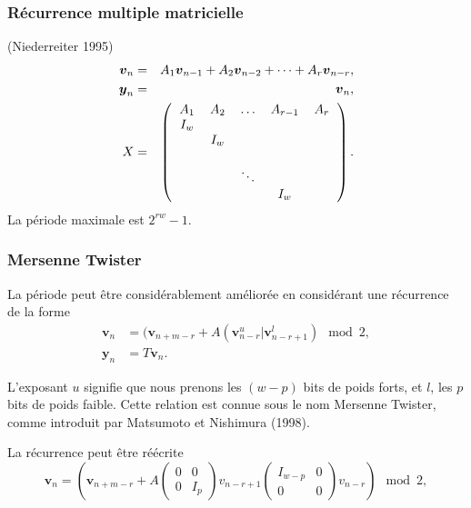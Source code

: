 \documentclass[t,usepdftitle=false]{beamer}
\def\bv{\boldsymbol{v}}
\def\by{\boldsymbol{y}}
\begin{document}
\begin{frame}
\frametitle{Récurrence multiple matricielle}

(Niederreiter 1995)
\begin {eqnarray*}
 \bv_n &=& A_1 \bv_{n-1} + A_2 \bv_{n-2} + \cdots + A_r \bv_{n-r},\\
 {\by_n} &=& \bv_{n}, \\
   X &=&
\left(
\begin{tabular}{ccccc}
$A_1$& $A_2$ & $\ldots$ & $A_{r-1}$ & $A_r$ \\
$I_w$&      &        &     &    \\
   &  $I_w$ &        &     &    \\
   &        &        &     &    \\
   &        &$\ddots$&     &    \\
   &        &        &$I_w$&
\end{tabular}
\right).
\end {eqnarray*}
La période maximale est $2^{rw}-1$.

\end{frame}

\begin{frame}
\frametitle{Mersenne Twister}

La période peut être considérablement améliorée en considérant une
récurrence de la forme
\begin{align*}
 \bv_n &= (\bv_{n+m-r} + A (\bv_{n-r}^{u} | \bv_{n-r+1}^l) \mod
 2, \\
 \by_n &= T \bv_{n}.
\end{align*}

\mbox{}

L'exposant $u$ signifie que nous prenons les $(w-p)$ bits de poids
forts, et $l$, les $p$ bits de poids faible.
Cette relation est connue sous le nom Mersenne Twister, comme
introduit par Matsumoto et Nishimura (1998).

\mbox{}

La récurrence peut être réécrite
\[
 \bv_n = \left( \bv_{n+m-r} + A
 \begin{pmatrix} 0 & 0 \\ 0 & I_p \end{pmatrix} v_{n-r+1}
 \begin{pmatrix} I_{w-p} & 0 \\ 0 & 0 \end{pmatrix} v_{n-r}
  \right) \mod 2,
\]

\end{frame}
\end{document}
